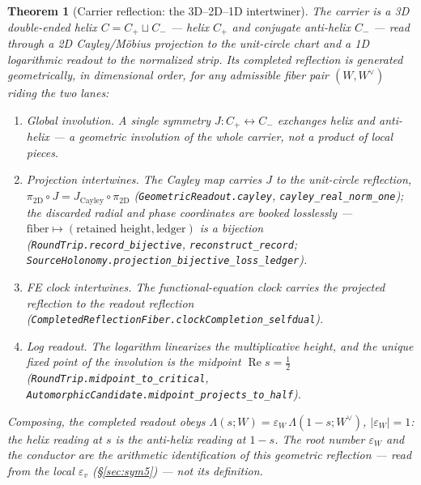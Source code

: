 \documentclass[11pt]{article}
\newtheorem{theorem}{Theorem}
\theoremstyle{definition}
\renewcommand{\Re}{\operatorname{Re}}
\begin{document}
\begin{theorem}[Carrier reflection: the 3D--2D--1D intertwiner]\label{thm:carrierreflection}
The carrier is a 3D double-ended helix $C=C_+\sqcup C_-$ --- helix $C_+$ and conjugate anti-helix $C_-$ ---
read through a 2D Cayley/M\"obius projection to the unit-circle chart and a 1D logarithmic readout to the
normalized strip. Its completed reflection is generated \emph{geometrically}, in dimensional order, for any
admissible fiber pair $(W,W^\vee)$ riding the two lanes:
\begin{enumerate}
\item[\textup{(J)}] \emph{Global involution.} A single symmetry $J\colon C_+\leftrightarrow C_-$ exchanges helix
and anti-helix --- a geometric involution of the \emph{whole} carrier, not a product of local pieces.
\item[\textup{(P)}] \emph{Projection intertwines.} The Cayley map carries $J$ to the unit-circle reflection,
$\pi_{2\mathrm D}\!\circ J=J_{\mathrm{Cayley}}\!\circ\pi_{2\mathrm D}$ (\texttt{GeometricReadout.cayley},
\texttt{cayley\_real\_norm\_one}); the discarded radial and phase coordinates are booked \emph{losslessly} ---
$\text{fiber}\mapsto(\text{retained height},\text{ledger})$ is a bijection
(\texttt{RoundTrip.record\_bijective}, \texttt{reconstruct\_record};
\texttt{SourceHolonomy.projection\_bijective\_loss\_ledger}).
\item[\textup{(C)}] \emph{FE clock intertwines.} The functional-equation clock carries the projected reflection
to the readout reflection (\texttt{CompletedReflectionFiber.clockCompletion\_selfdual}).
\item[\textup{(L)}] \emph{Log readout.} The logarithm linearizes the multiplicative height, and the unique
fixed point of the involution is the midpoint $\Re s=\tfrac12$ (\texttt{RoundTrip.midpoint\_to\_critical},
\texttt{AutomorphicCandidate.midpoint\_projects\_to\_half}).
\end{enumerate}
Composing, the completed readout obeys $\Lambda(s;W)=\varepsilon_W\,\Lambda(1-s;W^\vee)$, $|\varepsilon_W|=1$:
the helix reading at $s$ is the anti-helix reading at $1-s$. The root number $\varepsilon_W$ and the conductor
are the \emph{arithmetic identification} of this geometric reflection --- read from the local $\varepsilon_v$
(\S\ref{sec:sym5}) --- not its definition.
\end{theorem}
\end{document}
